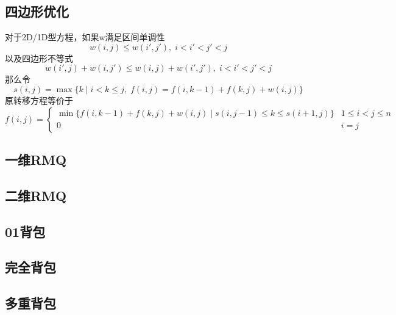 \subsection{四边形优化}
对于2D/1D型方程，如果w满足区间单调性
\begin{displaymath}
	w(i,j)\leqslant w(i',j'),\;i<i'<j'<j
\end{displaymath}
以及四边形不等式
\begin{displaymath}
	w(i',j)+w(i,j')\leqslant w(i,j)+w(i',j'),\;i<i'<j'<j
\end{displaymath}
那么令
\begin{displaymath}
	s(i,j)=\max\{k\;|\;i<k\leqslant j,\;f(i,j)=f(i,k-1)+f(k,j)+w(i,j)\}	
\end{displaymath}
原转移方程等价于
\begin{displaymath}
	f(i,j)=
		\begin{cases}
			\min\{f(i,k-1)+f(k,j)+w(i,j)\;|\;s(i,j-1)\leqslant k\leqslant s(i+1,j)\} & 1\leqslant i<j\leqslant n \\
			0                                                                        & i=j
		\end{cases}
\end{displaymath}

\subsection{一维RMQ}
\subsection{二维RMQ}

\subsection{01背包}
\subsection{完全背包}
\subsection{多重背包}

